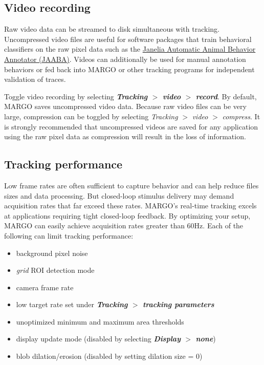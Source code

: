 \documentclass[11pt]{article}
\begin{document}
\subsection{Video recording}

Raw video data can be streamed to disk simultaneous with tracking. Uncompressed video files are useful for software packages that train behavioral classifiers on the raw pixel data such as the \href{http://jaaba.sourceforge.net/}{Janelia Automatic Animal Behavior Annotator (JAABA)}. Videos can additionally be used for manual annotation behaviors  or fed back into MARGO or other tracking programs for independent validation of traces.

Toggle video recording by selecting \textbf{\textit{Tracking} $>$ \textit{video} $>$ \textit{record}}. By default, MARGO saves uncompressed video data. Because raw video files can be very large, compression can be toggled by selecting \textit{Tracking} $>$ \textit{video} $>$ \textit{compress}. It is strongly recommended that uncompressed videos are saved for any application using the raw pixel data as compression will result in the loss of information.

\hypertarget{trackingperformance}{\subsection{Tracking performance}}

Low frame rates are often sufficient to capture behavior and can help reduce files sizes and data processing. But closed-loop stimulus delivery may demand acquisition rates that far exceed these rates. MARGO's real-time tracking excels at applications requiring tight closed-loop feedback. By optimizing your setup, MARGO can easily achieve acquisition rates greater than 60Hz. Each of the following can limit tracking performance:

\begin{itemize}
	\itemsep0em
	\item background pixel noise
	\item \textit{grid} ROI detection mode
	\item camera frame rate
	\item low target rate set under \textbf{\textit{Tracking} $>$ \textit{tracking parameters}}
	\item unoptimized minimum and maximum area thresholds
	\item display update mode (disabled by selecting \textbf{\textit{Display} $>$ \textit{none}})
	\item blob dilation/erosion (disabled by setting dilation size = 0)
\end{itemize} 
\end{document}

